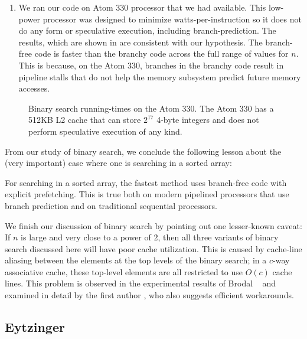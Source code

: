 \documentclass{patmorin}
\begin{document}
\begin{enumerate}
\item We ran our code on Atom 330 processor that we had available. This
   low-power processor was designed to minimize watts-per-instruction
   so it does not do any form or speculative execution, including
   branch-prediction. The results, which are shown in 
   are consistent with our hypothesis.  The branch-free code is faster
   than the branchy code across the full range of values for $n$.
   This is because, on the Atom 330, branches in the branchy code result
   in pipeline stalls that do not help the memory subsystem predict
   future memory accesses.
\end{enumerate}

\begin{figure}
   \caption{Binary search running-times on the Atom 330. The Atom 330
   has a 512KB L2 cache that can store $2^{17}$ 4-byte integers and does
   not perform speculative execution of any kind.}
\end{figure}

From our study of binary search, we conclude the following lesson about
the (very important) case where one is searching in a sorted array:

\begin{lesson}
  For searching in a sorted array, the fastest method uses branch-free
  code with explicit prefetching.  This is true both on modern pipelined
  processors that use branch prediction and on traditional sequential
  processors.
\end{lesson}

We finish our discussion of binary search by pointing out one lesser-known
caveat:  If $n$ is large and very close to a power of 2, then all
three variants of binary search discussed here will have poor cache
utilization.  This is caused by cache-line aliasing between the elements
at the top levels of the binary search; in a $c$-way associative cache,
these top-level elements are all restricted to use $O(c)$ cache lines.
This problem is observed in the experimental results of Brodal \etal\
\cite[Section~4.2]{brodal.fagerberg.ea:cache} and examined in detail
by the first author \cite{khuong:binary}, who also suggests efficient
workarounds.

\subsection{Eytzinger}
\end{document}
